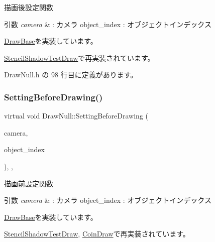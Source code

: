 描画後設定関数 


\begin{DoxyParams}{引数}
{\em camera} & \+: カメラ object\+\_\+index \+: オブジェクトインデックス \\
\hline
\end{DoxyParams}


\mbox{\hyperlink{class_draw_base_afe64f27b0bbf8c45da7aa0de4c3f3d65}{Draw\+Base}}を実装しています。



\mbox{\hyperlink{class_stencil_shadow_test_draw_a68917115d3f151ed91ce297924ee5bbb}{Stencil\+Shadow\+Test\+Draw}}で再実装されています。



 Draw\+Null.\+h の 98 行目に定義があります。

\mbox{\label{class_draw_null_a7f0d52c5c2fb2d9b8eb423f363862290}} 
\subsubsection{\texorpdfstring{Setting\+Before\+Drawing()}{SettingBeforeDrawing()}}
{\footnotesize\ttfamily virtual void Draw\+Null\+::\+Setting\+Before\+Drawing (\begin{DoxyParamCaption}\item[{\mbox{\hyperlink{class_camera}{Camera}} $\ast$}]{camera,  }\item[{unsigned}]{object\+\_\+index }\end{DoxyParamCaption})\hspace{0.3cm}{\ttfamily [inline]}, {\ttfamily [override]}, {\ttfamily [virtual]}}



描画前設定関数 


\begin{DoxyParams}{引数}
{\em camera} & \+: カメラ object\+\_\+index \+: オブジェクトインデックス \\
\hline
\end{DoxyParams}


\mbox{\hyperlink{class_draw_base_a3978252914ddde12197ea4577356bf25}{Draw\+Base}}を実装しています。



\mbox{\hyperlink{class_stencil_shadow_test_draw_a0f697b6dad67048c7f8916a53cca6b1c}{Stencil\+Shadow\+Test\+Draw}}, \mbox{\hyperlink{class_coin_draw_a66c03acd675ac1820977cb21015abfdb}{Coin\+Draw}}で再実装されています。



